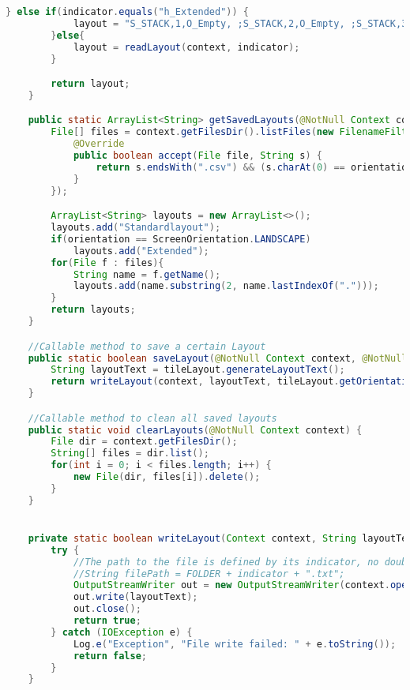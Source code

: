 \begin{lstlisting}[caption=TileLayoutLoader,label=list:TileLayoutLoader,language=Java]
        } else if(indicator.equals("h_Extended")) {
            layout = "S_STACK,1,O_Empty, ;S_STACK,2,O_Empty, ;S_STACK,3,O_Empty, ;A_ROOT,root;A_ZEROS,abc;S_SWAP,Swap;S_SPLIT,split;S_TOTUPLE,abc\nO_DOUBLE,1;O_DOUBLE,2;O_DOUBLE,3;A_PLUS,+;A_HIGHLOW,abc;O_FRACTION,(1/2);O_FRACTION,(3/4);H_HISTORY,1,O_Empty, \nO_DOUBLE,4;O_DOUBLE,5;O_DOUBLE,6;A_MINUS,-;A_INTEGRAL,abc;O_MATRIX,[[1, 2], [3, 4]];O_MATRIX,[[1, 0], [0, 1]];H_HISTORY,2,O_Empty, \nO_DOUBLE,7;O_DOUBLE,8;O_DOUBLE,9;A_SLASH,/;A_LIMES,abc;O_POLYNOM, -4x^0 + 4x^1 + 1x^2;O_POLYNOM, 0x^0 + 4x^1 + 2x^2;H_HISTORY,3,O_Empty, \nS_DEL,Delete;O_DOUBLE,0;S_ENTER,Enter;A_TIMES,*;A_MATRIXUTIL,LGS loesen;O_TUPLE,(1, 2);O_TUPLE,(2, 0);H_HISTORY,4,O_Empty, \nS_AC,AC;S_TURNAROUNDSIGN,+/-;S_DOT,.;S_INVERSE,1/x;A_LOG,ichundmeinlog;S_LOADLAYOUT,Load;S_SAVELAYOUT,Save;S_CLEARHISTORY,ifuknowwhatimean";
        }else{
            layout = readLayout(context, indicator);
        }

        return layout;
    }

    public static ArrayList<String> getSavedLayouts(@NotNull Context context, final ScreenOrientation orientation){
        File[] files = context.getFilesDir().listFiles(new FilenameFilter() {
            @Override
            public boolean accept(File file, String s) {
                return s.endsWith(".csv") && (s.charAt(0) == orientation.getIndicator());
            }
        });

        ArrayList<String> layouts = new ArrayList<>();
        layouts.add("Standardlayout");
        if(orientation == ScreenOrientation.LANDSCAPE)
            layouts.add("Extended");
        for(File f : files){
            String name = f.getName();
            layouts.add(name.substring(2, name.lastIndexOf(".")));
        }
        return layouts;
    }

    //Callable method to save a certain Layout
    public static boolean saveLayout(@NotNull Context context, @NotNull TileLayout tileLayout) {
        String layoutText = tileLayout.generateLayoutText();
        return writeLayout(context, layoutText, tileLayout.getOrientation().getIndicator() + "_" + tileLayout.getIndicator());
    }

    //Callable method to clean all saved layouts
    public static void clearLayouts(@NotNull Context context) {
        File dir = context.getFilesDir();
        String[] files = dir.list();
        for(int i = 0; i < files.length; i++) {
            new File(dir, files[i]).delete();
        }
    }


    private static boolean writeLayout(Context context, String layoutText, String indicator) {
        try {
            //The path to the file is defined by its indicator, no doubles allowed!
            //String filePath = FOLDER + indicator + ".txt";
            OutputStreamWriter out = new OutputStreamWriter(context.openFileOutput(indicator + ".csv", Context.MODE_PRIVATE));
            out.write(layoutText);
            out.close();
            return true;
        } catch (IOException e) {
            Log.e("Exception", "File write failed: " + e.toString());
            return false;
        }
    }


\end{lstlisting}
